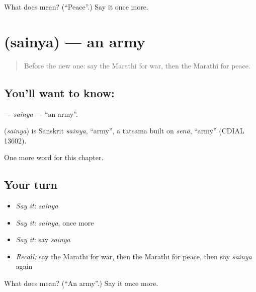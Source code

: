 \begin{tcolorbox}[breakable,colback=teal!4,colframe=teal!35!black,title={Before you move on}]
What does  mean? (\textquotedblleft{}Peace\textquotedblright{}.) Say it once more.
\end{tcolorbox}
\section[\texorpdfstring{\mr{सैन्य} (sainya)}{सैन्य (sainya)}]{ (sainya) — an army}

\label{lesson:MR-C209-sainya}



\begin{quote}
Before the new one: say the Marathi for war, then the Marathi for peace.
\end{quote}

\subsection*{You'll want to know: }
\textbf{} — \emph{sainya} — \textquotedblleft{}an army\textquotedblright{}.

\begin{cousinweb}
\textbf{} (\emph{sainya}) is Sanskrit \emph{sainya}, \textquotedblleft{}army\textquotedblright{}, a tatsama built on \emph{senā}, \textquotedblleft{}army\textquotedblright{} (CDIAL 13602).
\end{cousinweb}

\begin{grammarlens}[title={What you've built}]
One more word for this chapter.
\end{grammarlens}

\subsection*{Your turn}
\begin{itemize}
\raggedright
  \item \emph{Say it:} \emph{sainya}
  \item \emph{Say it:} \emph{sainya}, once more
  \item \emph{Say it:} say \emph{sainya}
  \item \emph{Recall:} say the Marathi for war, then the Marathi for peace, then say \emph{sainya} again
\end{itemize}

\begin{tcolorbox}[breakable,colback=teal!4,colframe=teal!35!black,title={Before you move on}]
What does  mean? (\textquotedblleft{}An army\textquotedblright{}.) Say it once more.
\end{tcolorbox}
